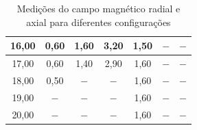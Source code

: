 \documentclass{article}
\begin{document}
\begin{table}[!ht]
\begin{tabular}{|c|c|c|c||c|c|c|}
16,00                                                                                                              & 0,60                           & 1,60                          & 3,20                            & 1,50                           & $-$                           & $-$                             \\ \hline
17,00                                                                                                              & 0,60                           & 1,40                          & 2,90                            & 1,60                           & $-$                           & $-$                             \\ \hline
18,00                                                                                                              & 0,50                           & $-$                           & $-$                             & 1,60                           & $-$                           & $-$                             \\ \hline
19,00                                                                                                              & $-$                            & $-$                           & $-$                             & 1,60                           & $-$                           & $-$                             \\ \hline
20,00                                                                                                              & $-$                            & $-$                           & $-$                             & 1,60                           & $-$                           & $-$                             \\ \hline
\end{tabular}
\caption{Medições do campo magnético radial e axial para diferentes configurações}
\label{tabbh}
\end{table}
\end{document}
